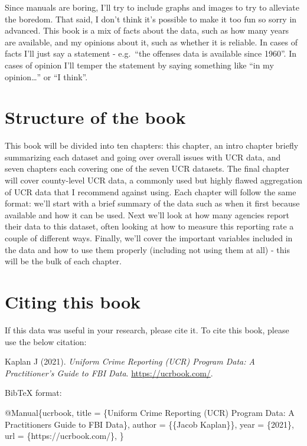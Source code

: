 \documentclass[
]{krantz}
\makeatletter
\newenvironment{Shaded}{\begin{snugshade}}{\end{snugshade}}
\newcommand{\DataTypeTok}[1]{\textcolor[rgb]{0.27,0.27,0.27}{#1}}
\newcommand{\NormalTok}[1]{#1}
\newcommand{\OtherTok}[1]{\textcolor[rgb]{0.37,0.37,0.37}{#1}}
\newcommand{\VariableTok}[1]{\textcolor[rgb]{0,0,0}{#1}}
\newenvironment{kframe}{%
\medskip{}
\setlength{\fboxsep}{.8em}
 \def\at@end@of@kframe{}%
 \ifinner\ifhmode%
  \def\at@end@of@kframe{\end{minipage}}%
  \begin{minipage}{\columnwidth}%
 \fi\fi%
 \def\FrameCommand##1{\hskip\@totalleftmargin \hskip-\fboxsep
 \colorbox{shadecolor}{##1}\hskip-\fboxsep
     \hskip-\linewidth \hskip-\@totalleftmargin \hskip\columnwidth}%
 \MakeFramed {\advance\hsize-\width
   \@totalleftmargin\z@ \linewidth\hsize
   \@setminipage}}%
 {\par\unskip\endMakeFramed%
 \at@end@of@kframe}
\renewenvironment{Shaded}{\begin{kframe}}{\end{kframe}}
\makeatother
\begin{document}
Since manuals are boring, I'll try to include graphs and
images to try to alleviate the boredom. That said, I don't
think it's possible to make it too fun so sorry in advanced.
This book is a mix of facts about the data, such as how many
years are available, and my opinions about it, such as
whether it is reliable. In cases of facts I'll just say a
statement - e.g.~``the offenses data is available since
1960''. In cases of opinion I'll temper the statement by
saying something like ``in my opinion\ldots{}'' or ``I
think''.

\section{Structure of the book}\label{structure-of-the-book}

This book will be divided into ten chapters: this chapter,
an intro chapter briefly summarizing each dataset and going
over overall issues with UCR data, and seven chapters each
covering one of the seven UCR datasets. The final chapter
will cover county-level UCR data, a commonly used but highly
flawed aggregation of UCR data that I recommend against
using. Each chapter will follow the same format: we'll start
with a brief summary of the data such as when it first
because available and how it can be used. Next we'll look at
how many agencies report their data to this dataset, often
looking at how to measure this reporting rate a couple of
different ways. Finally, we'll cover the important variables
included in the data and how to use them properly (including
not using them at all) - this will be the bulk of each
chapter.

\section{Citing this book}\label{citing-this-book}

If this data was useful in your research, please cite it. To
cite this book, please use the below citation:

Kaplan J (2021). \emph{Uniform Crime Reporting (UCR) Program
Data: A Practitioner's Guide to FBI Data}.
\url{https://ucrbook.com/}.

BibTeX format:

\begin{Shaded}
\begin{Highlighting}[]
\VariableTok{@Manual}\NormalTok{\{}\OtherTok{ucrbook}\NormalTok{,}
  \DataTypeTok{title}\NormalTok{ = \{Uniform Crime Reporting (UCR) Program Data: A Practitioner\textquotesingle{}s Guide to FBI Data\},}
  \DataTypeTok{author}\NormalTok{ = \{\{Jacob Kaplan\}\},}
  \DataTypeTok{year}\NormalTok{ = \{2021\},}
  \DataTypeTok{url}\NormalTok{ = \{https://ucrbook.com/\},}
\NormalTok{\}}
\end{Highlighting}
\end{Shaded}
\end{document}
